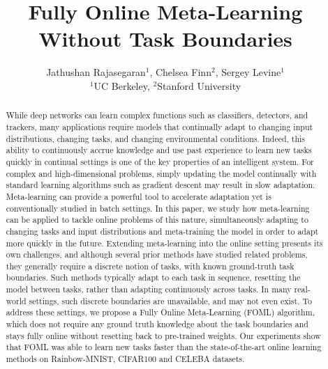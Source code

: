\documentclass{article} %
\title{Fully Online Meta-Learning Without Task Boundaries}
\author{Jathushan Rajasegaran$^{1}$, Chelsea Finn$^{2}$, Sergey Levine$^{1}$\\
$^{1}$UC Berkeley, $^{2}$Stanford University \\
}
\begin{document}
\maketitle

\begin{abstract}
While deep networks can learn complex functions such as classifiers, detectors, and trackers, many applications require models that continually adapt to changing input distributions, changing tasks, and changing environmental conditions. Indeed, this ability to continuously accrue knowledge and use past experience to learn new tasks quickly in continual settings is one of the key properties of an intelligent system. For complex and high-dimensional problems, simply updating the model continually with standard learning algorithms such as gradient descent may result in slow adaptation. Meta-learning can provide a powerful tool to accelerate adaptation yet is conventionally studied in batch settings. In this paper, we study how meta-learning can be applied to tackle online problems of this nature, simultaneously adapting to changing tasks and input distributions and meta-training the model in order to adapt more quickly in the future. Extending meta-learning into the online setting presents its own challenges, and although several prior methods have studied related problems, they generally require a discrete notion of tasks, with known ground-truth task boundaries. Such methods typically adapt to each task in sequence, resetting the model between tasks, rather than adapting continuously across tasks. In many real-world settings, such discrete boundaries are unavailable, and may not even exist. To address these settings, we propose a Fully Online Meta-Learning (FOML) algorithm, which does not require any ground truth knowledge about the task boundaries and stays fully online without resetting back to pre-trained weights. Our experiments show that FOML was able to learn new tasks faster than the state-of-the-art online learning methods on Rainbow-MNIST, CIFAR100 and CELEBA datasets.
\end{abstract}












\appendix

\end{document}
